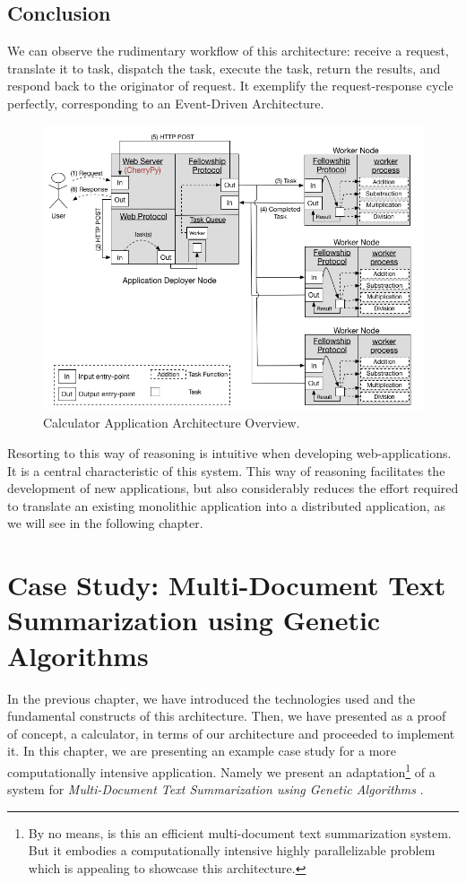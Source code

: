 \documentclass[12pt, titlepage]{uo_temp}
\begin{document}
     \section{Conclusion}
     We can observe the rudimentary workflow of this architecture: receive a request,
     translate it to task, dispatch the task, execute the task, return the results, and
     respond back to the originator of request. It exemplify the request-response cycle
     perfectly, corresponding to an Event-Driven Architecture.
     \begin{figure}[h!]
       \centering
       \includegraphics[width=150mm]{images/calculator.png}
       \caption{Calculator Application Architecture Overview.}
     \end{figure}
     Resorting to this way of reasoning is intuitive when developing web-applications. It
     is a central characteristic of this system. This way of reasoning facilitates the
     development of new applications, but also considerably reduces the effort required to
     translate an existing monolithic application into a distributed application, as we
     will see in the following chapter.

     \chapter{Case Study: Multi-Document Text Summarization using Genetic Algorithms}
     In the previous chapter, we have introduced the technologies used and the fundamental
     constructs of this architecture. Then, we have presented as a proof of concept, a
     calculator, in terms of our architecture and proceeded to implement it. In this
     chapter, we are presenting an example case study for a more computationally intensive
     application. Namely we present an adaptation\footnote{By no means, is this an
       efficient multi-document text summarization system. But it embodies a
       computationally intensive highly parallelizable problem which is appealing to
       showcase this architecture.} of a system for \emph{Multi-Document Text
       Summarization using Genetic Algorithms} \cite{qazvinian2008summarising}.
\end{document}
